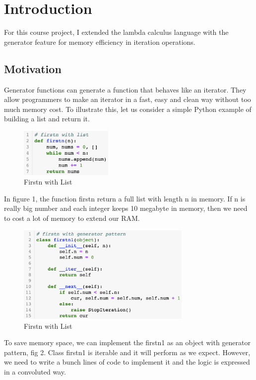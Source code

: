 
\section{Introduction}
For this course project, I extended the lambda calculus language with the generator feature for memory efficiency in iteration operations.

\subsection{Motivation}
Generator functions can generate a function that behaves like an iterator. They allow programmers to make an iterator in a fast, easy and clean way without too much memory cost. To illustrate this, let us consider a simple Python example of building a list and return it\cite{generators}.
%
\begin{figure}[H]
	\centering
	\includegraphics[width=0.4\textwidth]{figures/fstn}
	\caption{Firstn with List}
\end{figure}
%
In figure 1, the function firstn return a full list with length n in memory. If n is really big number and each integer keeps 10 megabyte in memory, then we need to cost a lot of memory to extend our RAM.
%
\begin{figure}[H]
	\centering
	\includegraphics[width=0.75\textwidth]{figures/fstn1}
	\caption{Firstn with List}
\end{figure}
%
To save memory space, we can implement the firstn1 as an object with generator pattern, fig 2. Class firstn1 is iterable and it will perform as we expect. However, we need to write a bunch lines of code to implement it and the logic is expressed in a convoluted way.

